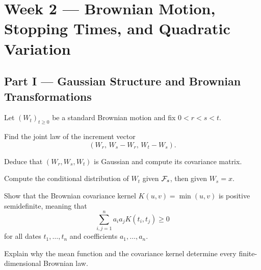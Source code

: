 
\section{Week 2 --- Brownian Motion, Stopping Times, and Quadratic Variation}


\subsection*{Part I --- Gaussian Structure and Brownian Transformations}

\begin{exercise}
Let \((W_t)_{t\geq0}\) be a standard Brownian motion and fix
\(0<r<s<t\).
\begin{exparts}
  \item Find the joint law of the increment vector
  \[
  (W_r,\,W_s-W_r,\,W_t-W_s).
  \]
  \item Deduce that \((W_r,W_s,W_t)\) is Gaussian and compute its covariance
  matrix.
  \item Compute the conditional distribution of \(W_t\) given \(\mathcal{F}_s\),
  then given \(W_s=x\).
  \item Show that the Brownian covariance kernel
  \(K(u,v)=\min(u,v)\) is positive semidefinite, meaning that
  \[
  \sum_{i,j=1}^n a_i a_j K(t_i,t_j)\geq0
  \]
  for all dates \(t_1,\ldots,t_n\) and coefficients
  \(a_1,\ldots,a_n\).
  \item Explain why the mean function and the covariance kernel determine
  every finite-dimensional Brownian law.
\end{exparts}
\end{exercise}

